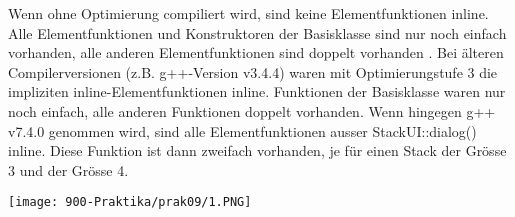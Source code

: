 Wenn ohne Optimierung compiliert wird, sind keine Elementfunktionen inline. Alle Elementfunktionen und Konstruktoren der Basisklasse sind nur noch einfach vorhanden, alle anderen Elementfunktionen sind doppelt vorhanden
.
Bei älteren Compilerversionen (z.B. g++-Version v3.4.4) waren mit Optimierungstufe 3 die impliziten inline-Elementfunktionen inline. Funktionen der Basisklasse waren nur noch einfach, alle anderen Funktionen doppelt vorhanden. Wenn hingegen g++ v7.4.0 genommen wird, sind alle Elementfunktionen ausser StackUI::dialog() inline. Diese Funktion ist dann zweifach vorhanden, je für einen Stack der Grösse 3 und der Grösse 4.


\noindent\makebox[\linewidth]{\rule{\paperwidth}{0.4pt}}

\noindent\makebox[\linewidth]{\rule{\paperwidth}{0.4pt}}

\noindent\makebox[\linewidth]{\rule{\paperwidth}{0.4pt}}

\noindent\makebox[\linewidth]{\rule{\paperwidth}{0.4pt}}

\noindent\makebox[\linewidth]{\rule{\paperwidth}{0.4pt}}

\noindent\makebox[\linewidth]{\rule{\paperwidth}{0.4pt}}


\begin{center}
  \texttt{[image: 900-Praktika/prak09/1.PNG]}
\end{center}
